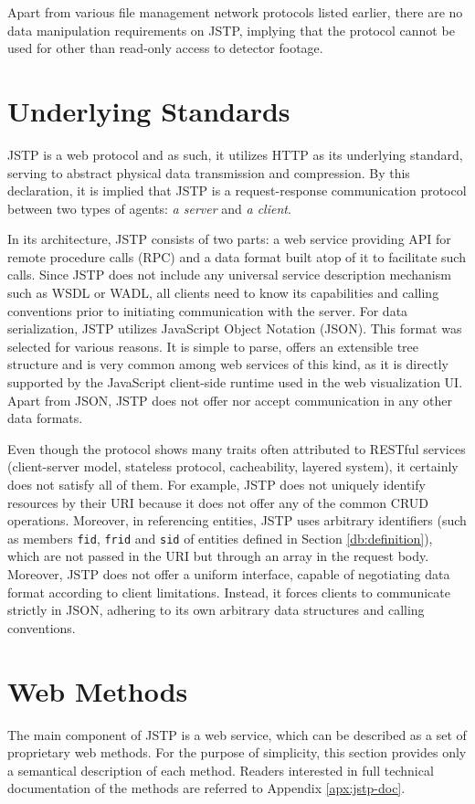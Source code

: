 Apart from various file management network protocols listed earlier, there are no data manipulation requirements on JSTP, implying that the protocol cannot be used for other than read-only access to detector footage.

\section{Underlying Standards}
JSTP is a web protocol and as such, it utilizes HTTP as its underlying standard, serving to abstract physical data transmission and compression. By this declaration, it is implied that JSTP is a request-response communication protocol between two types of agents: \textit{a server} and \textit{a client}.

In its architecture, JSTP consists of two parts: a web service providing API for remote procedure calls (RPC) and a data format built atop of it to facilitate such calls. Since JSTP does not include any universal service description mechanism such as WSDL or WADL, all clients need to know its capabilities and calling conventions prior to initiating communication with the server. For data serialization, JSTP utilizes JavaScript Object Notation (JSON). This format was selected for various reasons. It is simple to parse, offers an extensible tree structure and is very common among web services of this kind, as it is directly supported by the JavaScript client-side runtime used in the web visualization UI. Apart from JSON, JSTP does not offer nor accept communication in any other data formats.

Even though the protocol shows many traits often attributed to RESTful services (client-server model, stateless protocol, cacheability, layered system), it certainly does not satisfy all of them. For example, JSTP does not uniquely identify resources by their URI because it does not offer any of the common CRUD operations. Moreover, in referencing entities, JSTP uses arbitrary identifiers (such as members \texttt{fid}, \texttt{frid} and \texttt{sid} of entities defined in Section \ref{db:definition}), which are not passed in the URI but through an array in the request body. Moreover, JSTP does not offer a uniform interface, capable of negotiating data format according to client limitations. Instead, it forces clients to communicate strictly in JSON, adhering to its own arbitrary data structures and calling conventions.

\section{Web Methods}
\label{jstp:web-methods}
The main component of JSTP is a web service, which can be described as a set of proprietary web methods. For the purpose of simplicity, this section provides only a semantical description of each method. Readers interested in full technical documentation of the methods are referred to Appendix \ref{apx:jstp-doc}.

